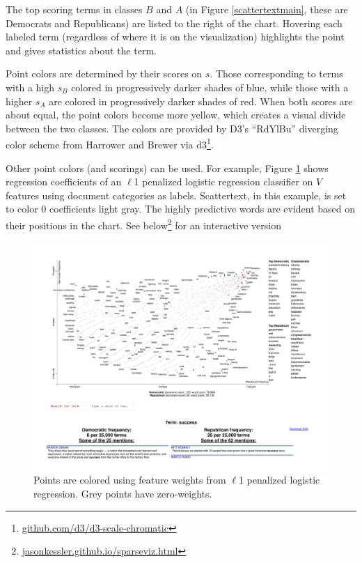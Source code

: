 \documentclass[11pt,a4paper]{article}
\begin{document}
The top scoring terms in classes $B$ and $A$ (in Figure \ref{scattertextmain}, these are Democrats and Republicans) are listed to the right of the chart.  Hovering each labeled term (regardless of where it is on the visualization) highlights the point and gives statistics about the term.  

Point colors are determined by their scores on $s$.  Those corresponding to terms with a high $s_B$ colored in progressively darker shades of blue, while those with a higher $s_A$ are colored in progressively darker shades of red.  When both scores are about equal, the point colors become more yellow, which creates a visual divide between the two classes.   The colors are provided by D3's ``RdYlBu'' diverging color scheme from Harrower and Brewer \cite{colorbrewer} via d3\footnote{\href{https://github.com/d3/d3-scale-chromatic}{github.com/d3/d3-scale-chromatic}}.

Other point colors (and scorings) can be used.  For example, Figure \ref{scattertextsparse} shows regression coefficients of an $\ell$1 penalized logistic regression classifier on $V$ features using document categories as labels.  Scattertext, in this example, is set to color 0 coefficients light gray.  The highly predictive words are evident based on their positions in the chart.  See below\footnote{
\href{https://jasonkessler.github.io/sparseviz.html}{jasonkessler.github.io/sparseviz.html}} for an interactive version

\begin{figure}[h]
  \includegraphics[width=\linewidth]{sparse_scattertext}
  \caption{Points are colored using feature weights from $\ell$1 penalized logistic regression.  Grey points have zero-weights.}
  \label{scattertextsparse}
\end{figure}
\end{document}
